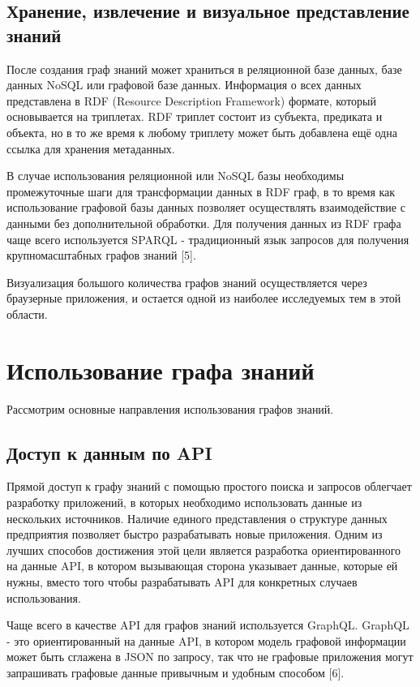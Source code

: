 \subsection{Хранение, извлечение и визуальное представление знаний}

После создания граф знаний может храниться в реляционной базе данных, базе данных NoSQL или графовой базе данных. Информация о всех данных
представлена в RDF (Resource Description Framework) формате, который основывается на триплетах. RDF триплет состоит из субъекта, предиката и
объекта, но в то же время к любому триплету может быть добавлена ещё одна ссылка для хранения метаданных.

В случае использования реляционной или NoSQL базы необходимы промежуточные шаги для трансформации данных в RDF граф, в то время как
использование графовой базы данных позволяет осуществлять взаимодействие с данными без дополнительной обработки. Для получения данных из RDF
графа чаще всего используется SPARQL - традиционный язык запросов для получения крупномасштабных графов знаний [5].

Визуализация большого количества графов знаний осуществляется через браузерные приложения, и остается одной из наиболее исследуемых тем в этой области.


\section{Использование графа знаний}

Рассмотрим основные направления использования графов знаний.

\subsection{Доступ к данным по API}

Прямой доступ к графу знаний с помощью простого поиска и запросов облегчает разработку приложений, в которых необходимо использовать данные
из нескольких источников. Наличие единого представления о структуре данных предприятия позволяет быстро разрабатывать новые приложения.
Одним из лучших способов достижения этой цели является разработка ориентированного на данные API, в котором вызывающая сторона указывает
данные, которые ей нужны, вместо того чтобы разрабатывать API для конкретных случаев использования.

Чаще всего в качестве API для графов знаний используется GraphQL. GraphQL - это ориентированный на данные API, в котором модель графовой
информации может быть сглажена в JSON по запросу, так что не графовые приложения могут запрашивать графовые данные привычным и удобным способом [6].

